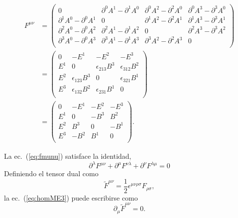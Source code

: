 \begin{align}
  F^{\mu\nu}&=
  \begin{pmatrix}
    0       &\partial^0A^1-\partial^1A^0&\partial^0A^2-\partial^2A^0&\partial^0A^3-\partial^3A^0\\
    \partial^1A^0-\partial^0A^1&0       &\partial^1A^2-\partial^2A^1&\partial^1A^3-\partial^3A^1\\
    \partial^2A^0-\partial^0A^2&\partial^2A^1-\partial^1A^2&0       &\partial^2A^3-\partial^3A^2\\
    \partial^3A^0-\partial^0A^3&\partial^3A^1-\partial^1A^3&\partial^3A^2-\partial^2A^3&0\\
  \end{pmatrix}\nonumber\\
  &=
  \begin{pmatrix}
    0 &-E^1   &-E^2   &-E^3   \\    
    E^1&0     &\epsilon_{213}B^3&\epsilon_{312}B^2\\
    E^2&\epsilon_{123}B^3&0     &\epsilon_{321}B^1\\
    E^3&\epsilon_{132}B^2&\epsilon_{231}B^1&0\\
  \end{pmatrix}\nonumber\\
  &=
\label{eq:matrixfmunu}
  \begin{pmatrix}
    0 &-E^1&-E^2&-E^3   \\    
    E^1&0  &-B^3&B^2\\
    E^2&B^3 &0  &-B^1\\
    E^3&-B^2&B^1 &0\\
  \end{pmatrix}.
\end{align}

La ec.~(\ref{eq:fmunu}) satisface la identidad,
\begin{equation}
  \label{eq:homME3}
  \partial^\lambda F^{\mu\nu}+\partial^\mu F^{\nu\lambda}+\partial^\nu F^{\lambda\mu}=0
\end{equation}
Definiendo el tensor dual como
\begin{equation*}
  \tilde{F}^{\mu\nu}=\frac{1}{2}\epsilon^{\mu\nu\rho\sigma}F_{\rho\sigma},
\end{equation*}
la ec.~(\ref{eq:homME3}) puede escribirse como
\begin{equation}
  \label{eq:homEM4}
  \partial_\mu\tilde{F}^{\mu\nu}=0.
\end{equation}

